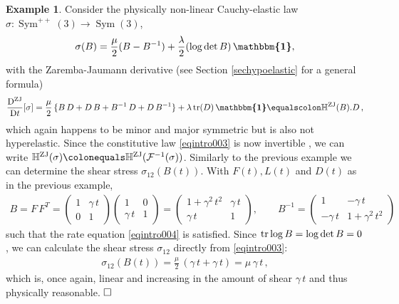 \documentclass[10pt]{article}
\newcounter{theoremCounter}
\numberwithin{theoremCounter}{section}
\theoremstyle{plain}
\theoremstyle{definition}
\newtheorem{example}[theoremCounter]{Example}
\newcommand{\id}{{\boldsymbol{\mathbbm{1}}}}
\newcommand{\DD}{\mathrm{D}}
\DeclareMathOperator{\Sym}{Sym}
\DeclareMathOperator{\tr}{tr}
\DeclareMathOperator{\ZJ}{ZJ}
\def\tr{\textnormal{tr}}
\def\H{\mathbb{H}}
\numberwithin{equation}{section}
\begin{document}
\begin{example}
Consider the physically non-linear Cauchy-elastic law $\sigma\colon \Sym^{++}(3) \to \Sym(3)$,
	\begin{align}
	\label{eqintro003}
	\sigma(B)= \frac{\mu}{2}(B-B^{-1})+\frac{\lambda}{2} (\log \det B) \, \id,
	\end{align}
with the Zaremba-Jaumann derivative \cite{zaremba1903forme,jaumann1911geschlossenes} (see Section \ref{sechypoelastic} for a general formula)
	\begin{align}
	\label{eqintro004}
	\frac{\DD^{\ZJ}}{\DD t}[\sigma] = \frac{\mu}{2} \, \{B \, D + D \, B + B^{-1} \, D + D \, B^{-1}\} + \lambda \, \tr(D) \, \id \equalscolon\H^{\ZJ}(B).D \, ,
	\end{align}
which again happens to be minor and major symmetric but is also not hyperelastic. Since the constitutive law \eqref{eqintro003} is now invertible \cite{ghiba2024}, we can write $\H^{\ZJ}(\sigma) \colonequals \H^{\ZJ}(\mathcal{F}^{-1}(\sigma))$. Similarly to the previous example we can determine the shear stress $\sigma_{12}(B(t))$. With $F(t), L(t)$ and $D(t)$ as in the previous example,
	\begin{align}
	B = F \, F^T =
	\begin{pmatrix}
	1 & \gamma \, t \\
	0 & 1
	\end{pmatrix}
	\begin{pmatrix}
	1 & 0 \\
	\gamma \, t & 1
	\end{pmatrix}
	=
	\begin{pmatrix}
	1 + \gamma^2 \, t^2 & \gamma \, t \\
	\gamma \, t & 1
	\end{pmatrix},
	\qquad
	B^{-1} =
	\begin{pmatrix}
	1 & -\gamma \, t \\
	-\gamma \, t & 1 + \gamma^2 \, t^2
	\end{pmatrix}
	\end{align}
such that the rate equation \eqref{eqintro004} is satisfied. Since $\tr \log B = \log \det B = 0$, we can calculate the shear stress $\sigma_{12}$ directly from \eqref{eqintro003}:
	\begin{align}
	\sigma_{12}(B(t)) = \frac{\mu}{2} \, (\gamma \, t + \gamma \, t) = \mu \, \gamma \, t \, ,
	\end{align}
which is, once again, linear and increasing in the amount of shear $\gamma \, t$ and thus physically reasonable. $\hfill{\square}$
\end{example}
\end{document}

